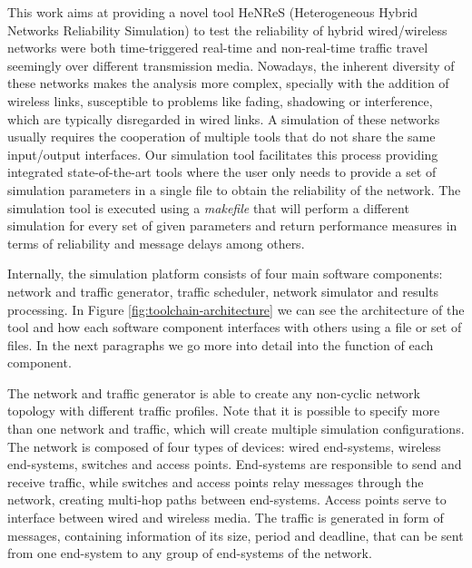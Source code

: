 \documentclass[conference]{IEEEtran}
\begin{document}

This work aims at providing a novel tool HeNReS (Heterogeneous Hybrid Networks Reliability Simulation) to test the reliability of hybrid wired/wireless networks were both time-triggered real-time and non-real-time traffic travel seemingly over different transmission media. Nowadays, the inherent diversity of these networks makes the analysis more complex, specially with the addition of wireless links, susceptible to problems like fading, shadowing or interference, which are typically disregarded in wired links. A simulation of these networks usually requires the cooperation of multiple tools that do not share the same input/output interfaces. Our simulation tool facilitates this process providing integrated state-of-the-art tools where the user only needs to provide a set of simulation parameters in a single file to obtain the reliability of the network. The simulation tool is executed using a \textit{makefile} that will perform a different simulation for every set of given parameters and return performance measures in terms of reliability and message delays among others.


Internally, the simulation platform consists of four main software components: network and traffic generator, traffic scheduler, network simulator and results processing. In Figure \ref{fig:toolchain-architecture} we can see the architecture of the tool and how each software component interfaces with others using a file or set of files. In the next paragraphs we go more into detail into the function of each component.

The network and traffic generator is able to create any non-cyclic network topology with different traffic profiles. Note that it is possible to specify more than one network and traffic, which will create multiple simulation configurations. The network is composed of four types of devices: wired end-systems, wireless end-systems, switches and access points. End-systems are responsible to send and receive traffic, while switches and access points relay messages through the network, creating multi-hop paths between end-systems. Access points serve to interface between wired and wireless media. The traffic is generated in form of messages, containing information of its size, period and deadline, that can be sent from one end-system to any group of end-systems of the network.
\end{document}
